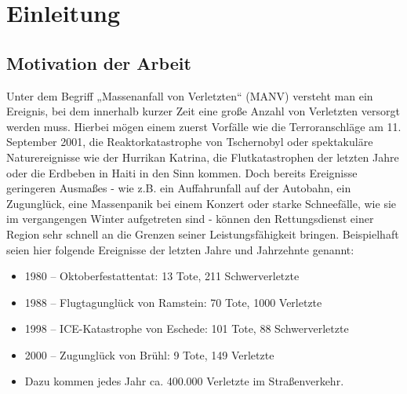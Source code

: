 \chapter{Einleitung}
\section{Motivation der Arbeit}
\nomenclature{Pollux}{Behälter zum Einlagern von Atommüll]}
Unter dem Begriff „Massenanfall von Verletzten“ (MANV) versteht man ein Ereignis, bei dem innerhalb
kurzer Zeit eine große Anzahl von Verletzten versorgt werden muss. Hierbei mögen einem zuerst
Vorfälle wie die Terroranschläge am 11. September 2001, die Reaktorkatastrophe von Tschernobyl oder
spektakuläre Naturereignisse wie der Hurrikan Katrina, die Flutkatastrophen der letzten Jahre oder die
Erdbeben in Haiti in den Sinn kommen.
Doch bereits Ereignisse geringeren Ausmaßes - wie z.B. ein Auffahrunfall auf der Autobahn, ein
Zugunglück, eine Massenpanik bei einem Konzert oder starke Schneefälle, wie sie im vergangengen
Winter aufgetreten sind - können den Rettungsdienst einer Region sehr schnell an die Grenzen seiner
Leistungsfähigkeit bringen.
Beispielhaft seien hier folgende Ereignisse der letzten Jahre und Jahrzehnte genannt:

\begin{itemize}
    \item 1980 – Oktoberfestattentat: 13 Tote, 211 Schwerverletzte
    \item 1988 – Flugtagunglück von Ramstein: 70 Tote, 1000 Verletzte
    \item 1998 – ICE-Katastrophe von Eschede: 101 Tote, 88 Schwerverletzte
    \item 2000 – Zugunglück von Brühl: 9 Tote, 149 Verletzte
    \item Dazu kommen jedes Jahr ca. 400.000 Verletzte im Straßenverkehr.
\end{itemize}

